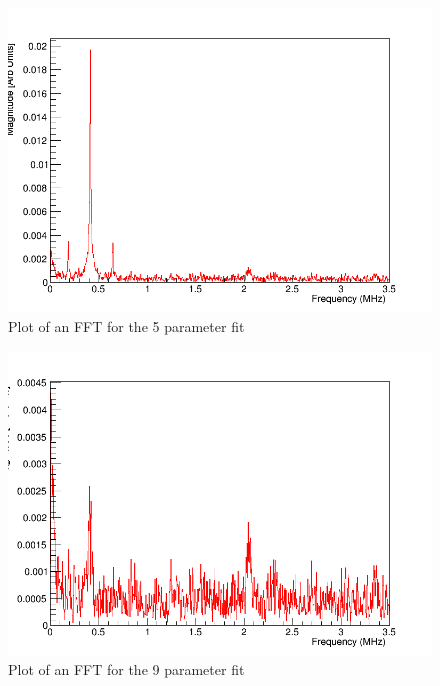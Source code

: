 \begin{figure}[!h]
\centering 
\includegraphics[scale=0.5]{Figures/5par_fft.png}
\decoRule
\caption{Plot of an FFT for the 5 parameter fit}
\label{fig:5par_fft}
\end{figure}

\iffalse
\begin{figure}[!h]
\centering 
\includegraphics[scale=0.5]{Figures/9par_fft.png}
\decoRule
\caption{Plot of an FFT for the 9 parameter fit}
\label{fig:9par_fft}
\end{figure}

